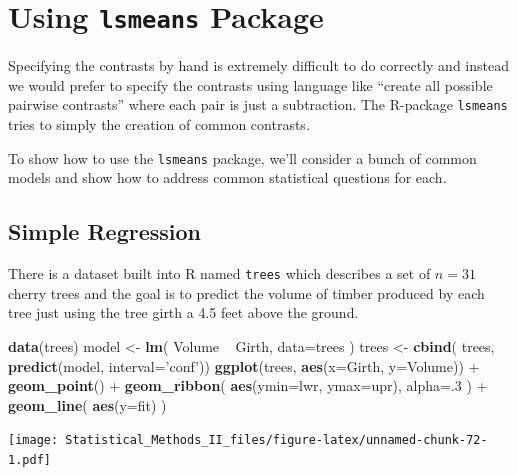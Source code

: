 \documentclass[]{book}
\newenvironment{Shaded}{\begin{snugshade}}{\end{snugshade}}
\newcommand{\KeywordTok}[1]{\textcolor[rgb]{0.13,0.29,0.53}{\textbf{{#1}}}}
\newcommand{\DataTypeTok}[1]{\textcolor[rgb]{0.13,0.29,0.53}{{#1}}}
\newcommand{\DecValTok}[1]{\textcolor[rgb]{0.00,0.00,0.81}{{#1}}}
\newcommand{\StringTok}[1]{\textcolor[rgb]{0.31,0.60,0.02}{{#1}}}
\newcommand{\NormalTok}[1]{{#1}}
\theoremstyle{definition}
\theoremstyle{definition}
\theoremstyle{remark}
\begin{document}
\section{\texorpdfstring{Using \texttt{lsmeans}
Package}{Using lsmeans Package}}\label{using-lsmeans-package}

Specifying the contrasts by hand is extremely difficult to do correctly
and instead we would prefer to specify the contrasts using language like
``create all possible pairwise contrasts'' where each pair is just a
subtraction. The R-package \texttt{lsmeans} tries to simply the creation
of common contrasts.

To show how to use the \texttt{lsmeans} package, we'll consider a bunch
of common models and show how to address common statistical questions
for each.

\subsection{Simple Regression}\label{simple-regression-1}

There is a dataset built into R named \texttt{trees} which describes a
set of \(n=31\) cherry trees and the goal is to predict the volume of
timber produced by each tree just using the tree girth a 4.5 feet above
the ground.

\begin{Shaded}
\begin{Highlighting}[]
\KeywordTok{data}\NormalTok{(trees)}
\NormalTok{model <-}\StringTok{ }\KeywordTok{lm}\NormalTok{( Volume ~}\StringTok{ }\NormalTok{Girth, }\DataTypeTok{data=}\NormalTok{trees )}
\NormalTok{trees <-}\StringTok{ }\KeywordTok{cbind}\NormalTok{( trees, }\KeywordTok{predict}\NormalTok{(model, }\DataTypeTok{interval=}\StringTok{'conf'}\NormalTok{))}
\KeywordTok{ggplot}\NormalTok{(trees, }\KeywordTok{aes}\NormalTok{(}\DataTypeTok{x=}\NormalTok{Girth, }\DataTypeTok{y=}\NormalTok{Volume)) +}
\StringTok{  }\KeywordTok{geom_point}\NormalTok{() +}
\StringTok{  }\KeywordTok{geom_ribbon}\NormalTok{( }\KeywordTok{aes}\NormalTok{(}\DataTypeTok{ymin=}\NormalTok{lwr, }\DataTypeTok{ymax=}\NormalTok{upr), }\DataTypeTok{alpha=}\NormalTok{.}\DecValTok{3} \NormalTok{) +}
\StringTok{  }\KeywordTok{geom_line}\NormalTok{( }\KeywordTok{aes}\NormalTok{(}\DataTypeTok{y=}\NormalTok{fit) )}
\end{Highlighting}
\end{Shaded}

\texttt{[image: Statistical\_Methods\_II\_files/figure-latex/unnamed-chunk-72-1.pdf]}
\end{document}
